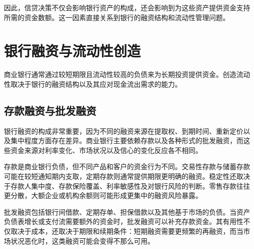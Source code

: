 因此，信贷决策不仅会影响银行资产的构成，还会影响到为这些资产提供资金支持所需的资金数额。这一因素直接关系到银行的融资结构和流动性管理问题。

\section{银行融资与流动性创造}

商业银行通常通过较短期限且流动性较高的负债来为长期投资提供资金。创造流动性取决于银行的融资结构以及其应对现金流出需求的能力。

\subsection{存款融资与批发融资}

银行融资的构成非常重要，因为不同的融资来源在提取权、到期时间、重新定价以及集中程度方面存在差异。商业银行主要依赖存款以及各种形式的批发融资，而这些资金来源对利率变化、市场状况以及信心的变化反应各不相同。

存款是商业银行负债，但不同产品和客户的资金行为不同。交易性存款与储蓄存款可能在较短通知期内支取，定期存款则通常提供期限更明确的融资。稳定性还取决于存款人集中度、存款保险覆盖、利率敏感性及对银行风险的判断。零售存款往往更分散，大额企业或机构余额则可能形成更集中的融资风险暴露。

批发融资包括银行间借款、定期存单、担保借款以及其他基于市场的负债。当资产负债表增长或支付流需要额外的资金时，批发融资可以补充存款资金。其有用性不仅取决于成本，还取决于期限和续期条件：短期融资需要更频繁的再融资，而当市场状况恶化时，这类融资可能会变得不那么可用。

